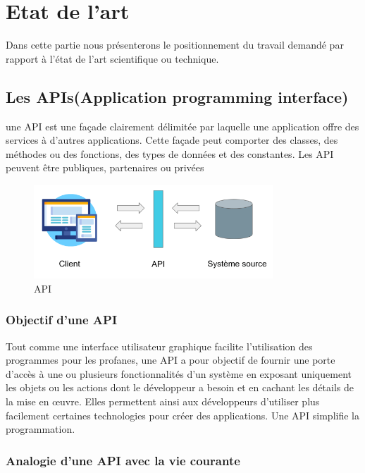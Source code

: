 
\chapter{Etat de l’art} %

\label{Chaptre3} %

Dans cette partie nous présenterons le positionnement du travail demandé par rapport à l’état de l’art scientifique ou technique.

\section{Les APIs(Application programming interface)}

une API est une façade clairement délimitée par laquelle une application offre des services à d’autres applications. Cette façade peut comporter des classes, des méthodes ou des fonctions, des types de données et
des constantes. Les API peuvent être publiques, partenaires ou privées
 \begin{figure}[!th]
            \centering
                \includegraphics[width=0.8\textwidth]{Figures/api}
	       \decoRule
		\caption[API]{API}
	\label{fig:api}
	\end{figure}
\subsection{Objectif d’une API}
Tout comme une interface utilisateur graphique facilite l’utilisation des programmes pour les profanes, une
API a pour objectif de fournir une porte d’accès à une ou plusieurs fonctionnalités d’un système en exposant
uniquement les objets ou les actions dont le développeur a besoin et en cachant les détails de la mise en
œuvre. Elles permettent ainsi aux développeurs d’utiliser plus facilement certaines technologies pour créer
des applications. Une API simplifie la programmation.



\subsection{Analogie d’une API avec la vie courante}

